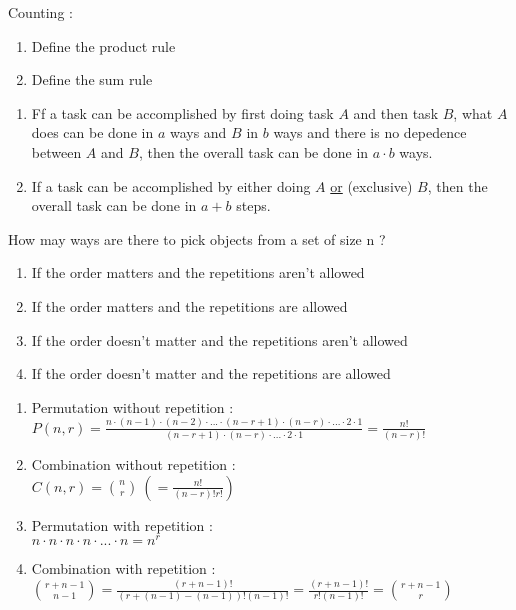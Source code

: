 \documentclass[12pt]{article}
\newcommand*{\xfield}[1]{\begin{mdframed}\centering #1\end{mdframed}\bigskip}
\newenvironment{note}{}{}
\begin{document}
\begin{note}
Counting :
	\xfield{\begin{enumerate}
		\item Define the product rule
		\item Define the sum rule
	\end{enumerate} }
	\xfield{\begin{enumerate}
		\item Ff a task can be accomplished by first doing task $A$ and then task $B$, what $A$ does can be done in $a$ ways and $B$ in $b$ ways and there is no depedence between $A$ and $B$, then the overall task can be done in $a\cdot b$ ways. 
		\item If a task can be accomplished by either doing $A$ \underline{or} (exclusive) $B$, then the overall task can be done in $a+b$ steps.
	\end{enumerate} }
\end{note}

\begin{note}
	How may ways are there to pick objects from a set of size n ?
	\xfield{\begin{enumerate}
		\item If the order matters and the repetitions aren't allowed
		\item If the order matters and the repetitions are allowed
		\item If the order doesn't matter and the repetitions aren't allowed
		\item If the order doesn't matter and the repetitions are allowed
	\end{enumerate} }
	\xfield{\begin{enumerate}
		\item Permutation without repetition :\\
			$P(n,r) = \frac{n\cdot(n-1)\cdot(n-2)\cdot ...\cdot(n-r+1)\cdot(n-r)\cdot ...\cdot 2\cdot 1}{(n-r+1)\cdot (n-r)\cdot ... \cdot 2 \cdot 1} = \frac{n!}{(n-r)!}$
		\item Combination without repetition :\\
		$C(n,r) = \binom{n}{r}\ (=\frac{n!}{(n-r)!r!})$
		\item Permutation with repetition :\\
		$n\cdot n\cdot n \cdot n \cdot ... \cdot n = n^r$
		\item Combination with repetition :\\
		$\binom{r+n-1}{n-1} = \frac{(r+n-1)!}{(r+(n-1)-(n-1))!(n-1)!} = \frac{(r+n-1)!}{r!(n-1)!} = \binom{r+n-1}{r}$
	\end{enumerate} }
\end{note}
\end{document}
